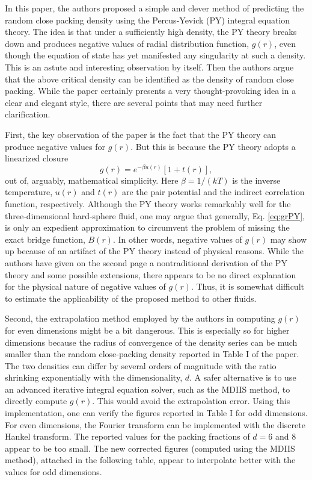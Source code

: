 \documentclass{article}
\begin{document}
In this paper, the authors proposed a simple and clever method of predicting
the random close packing density using the Percus-Yevick (PY) integral equation
theory.
The idea is that under a sufficiently high density, the PY theory breaks down
and produces negative values of radial distribution function, $g(r)$, even
though the equation of state has yet manifested any singularity
at such a density.
This is an astute and interesting observation by itself.
Then the authors argue that the above critical density can be identified as
the density of random close packing.
While the paper certainly presents a very thought-provoking idea in a clear
and elegant style, there are several points that may need further clarification.

First, the key observation of the paper is the fact that the PY theory can
produce negative values for $g(r)$.  But this is because the PY theory adopts
a linearized closure
\begin{equation}
g(r) = e^{-\beta u(r)} [ 1 + t(r) ],
\label{eq:grPY}
\end{equation}
out of, arguably, mathematical simplicity.
Here $\beta = 1/(kT)$ is the inverse temperature,
$u(r)$ and $t(r)$ are the pair potential and the indirect correlation
function, respectively.
Although the PY theory works remarkably well for the three-dimensional
hard-sphere fluid, one may argue that generally, Eq. \eqref{eq:grPY},
is only an expedient approximation to circumvent the problem of missing
the exact bridge function, $B(r)$.
In other words, negative values of $g(r)$ may show up because of an artifact
of the PY theory instead of physical reasons.
While the authors have given on the second page a nontraditional derivation
of the PY theory and some possible extensions, there appears to be no direct
explanation for the physical nature of negative values of $g(r)$.
Thus, it is somewhat difficult to estimate the applicability of the proposed
method to other fluids.


Second, the extrapolation method employed by the authors in computing $g(r)$
for even dimensions might be a bit dangerous.
This is especially so for higher dimensions because the radius of convergence
of the density series can be much smaller than the random close-packing
density reported in Table I of the paper.
The two densities can differ by several orders of magnitude with the ratio
shrinking exponentially with the dimensionality, $d$.
A safer alternative is to use an advanced iterative integral equation
solver, such as the MDIIS method\cite{pulay1980, pulay1982, kovalenko1999},
to directly compute $g(r)$.
This would avoid the extrapolation error.
Using this implementation, one can verify the figures reported in Table I for
odd dimensions.
For even dimensions, the Fourier transform can be implemented with the
discrete Hankel transform\cite{lado1967, johnson1987}.
The reported values for the packing fractions of $d = 6$ and $8$ appear to
be too small.
The new corrected figures (computed using the MDIIS method), attached in the
following table, appear to interpolate better with the values for odd
dimensions.
\end{document}
